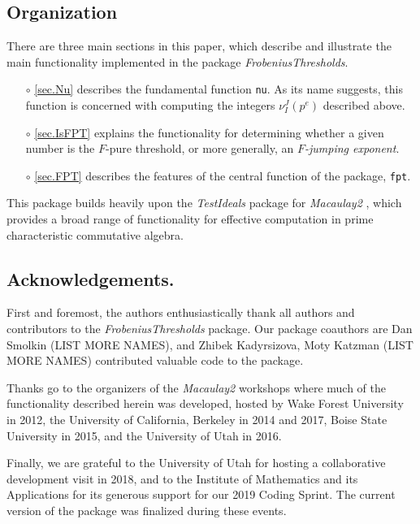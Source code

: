 \documentclass{amsart}
\begin{document}
\subsection*{Organization}

There are three main sections in this paper, which describe and illustrate the main functionality implemented in the package \emph{FrobeniusThresholds}.
\begin{itemize}
\item[$\circ$] \autoref{sec.Nu} describes the fundamental function {\tt nu}.  As its name suggests, this function is concerned with computing the integers $\nu_I^J(p^e)$ described above.
\item[$\circ$] \autoref{sec.IsFPT} explains the functionality for determining whether a given number is the $F$-pure threshold, or more generally, an \emph{$F$-jumping exponent}.
\item[$\circ$] \autoref{sec.FPT} describes the features of the central function of the package, {\tt fpt}.
\end{itemize}

This package builds heavily upon the \emph{TestIdeals} package for \emph{Macaulay2} \cite{TestIdealsPackage, TestIdealsPaper}, which provides a broad range of functionality for effective computation in prime characteristic commutative algebra.

\subsection*{Acknowledgements.}  First and foremost, the authors enthusiastically thank all authors and contributors to the \emph{FrobeniusThresholds} package.
Our package coauthors are Dan Smolkin {\color{red}(LIST MORE NAMES)}, and Zhibek Kadyrsizova, Moty Katzman {\color{red} (LIST MORE NAMES)} contributed valuable code to the package.

Thanks go to the organizers of the \emph{Macaulay2} workshops where much of the functionality described herein was developed, hosted by Wake Forest University in 2012, the University of California, Berkeley in 2014 and 2017, Boise State University in 2015, and the University of Utah in 2016.

Finally, we are grateful to the University of Utah for hosting a collaborative development visit in 2018, and to the Institute of Mathematics and its Applications for its generous support for our 2019 Coding Sprint.
The current version of the package was finalized during these events.
\end{document}
